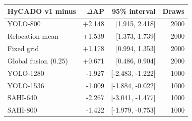 \begin{tabular}{lrrr}
\toprule
HyCADO v1 minus & $\Delta$AP & 95\% interval & Draws\\
\midrule
YOLO-800 & +2.148 & [1.915, 2.418] & 2000\\
Relocation mean & +1.539 & [1.373, 1.739] & 2000\\
Fixed grid & +1.178 & [0.994, 1.353] & 2000\\
Global fusion (0.25) & +0.671 & [0.486, 0.904] & 2000\\
YOLO-1280 & -1.927 & [-2.483, -1.222] & 1000\\
YOLO-1536 & -1.009 & [-1.884, -0.022] & 1000\\
SAHI-640 & -2.267 & [-3.041, -1.477] & 1000\\
SAHI-800 & -1.422 & [-1.979, -0.753] & 1000\\
\bottomrule
\end{tabular}
